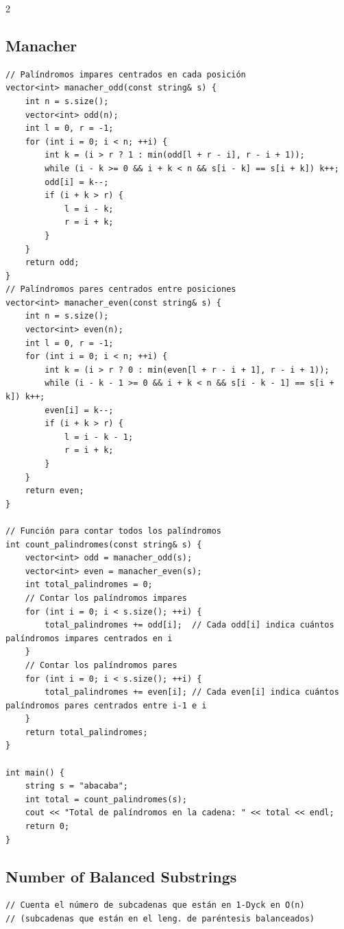 \documentclass[twoside]{article}
\begin{document}
\begin{multicols*}{2}
{		\subsection*{Manacher}
	}
	\begin{verbatim}
// Palíndromos impares centrados en cada posición
vector<int> manacher_odd(const string& s) {
    int n = s.size();
    vector<int> odd(n);
    int l = 0, r = -1;
    for (int i = 0; i < n; ++i) {
        int k = (i > r ? 1 : min(odd[l + r - i], r - i + 1));
        while (i - k >= 0 && i + k < n && s[i - k] == s[i + k]) k++;
        odd[i] = k--;
        if (i + k > r) {
            l = i - k;
            r = i + k;
        }
    }
    return odd;
}
// Palíndromos pares centrados entre posiciones
vector<int> manacher_even(const string& s) {
    int n = s.size();
    vector<int> even(n);
    int l = 0, r = -1;
    for (int i = 0; i < n; ++i) {
        int k = (i > r ? 0 : min(even[l + r - i + 1], r - i + 1));
        while (i - k - 1 >= 0 && i + k < n && s[i - k - 1] == s[i + k]) k++;
        even[i] = k--;
        if (i + k > r) {
            l = i - k - 1;
            r = i + k;
        }
    }
    return even;
}

// Función para contar todos los palíndromos
int count_palindromes(const string& s) {
    vector<int> odd = manacher_odd(s);
    vector<int> even = manacher_even(s);
    int total_palindromes = 0;
    // Contar los palíndromos impares
    for (int i = 0; i < s.size(); ++i) {
        total_palindromes += odd[i];  // Cada odd[i] indica cuántos palíndromos impares centrados en i
    }
    // Contar los palíndromos pares
    for (int i = 0; i < s.size(); ++i) {
        total_palindromes += even[i]; // Cada even[i] indica cuántos palíndromos pares centrados entre i-1 e i
    }
    return total_palindromes;
}

int main() {
    string s = "abacaba";
    int total = count_palindromes(s);
    cout << "Total de palíndromos en la cadena: " << total << endl;
    return 0;
}

\end{verbatim}

	{
		\subsection*{Number of Balanced Substrings}
	}
	\begin{verbatim}
// Cuenta el número de subcadenas que están en 1-Dyck en O(n)
// (subcadenas que están en el leng. de paréntesis balanceados)


\end{verbatim}
\end{multicols*}
\end{document}
